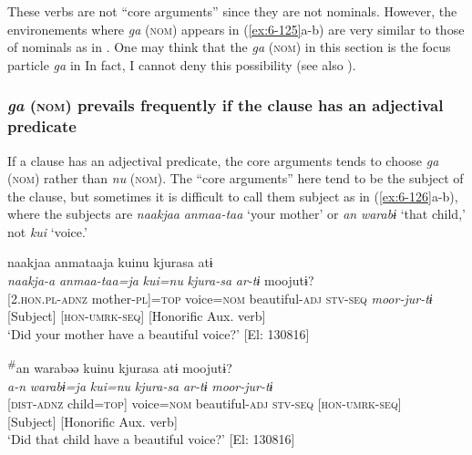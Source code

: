 These verbs are not “core arguments” since they are not nominals. However, the environements where \textit{ga} (\textsc{nom}) appears in (\ref{ex:6-125}a-b) are very similar to those of nominals as in . One may think that the \textit{ga} (\textsc{nom}) in this section is the focus particle \textit{ga} in  In fact, I cannot deny this possibility (see also ).

\subsubsection{\textit{ga} (\textsc{nom}) prevails frequently if the clause has an adjectival predicate}

If a clause has an adjectival predicate, the core arguments tends to choose \textit{ga} (\textsc{nom}) rather than \textit{nu} (\textsc{nom}). The “core arguments” here tend to be the subject of the clause, but sometimes it is difficult to call them subject as in (\ref{ex:6-126}a-b), where the subjects are \textit{naakjaa} \textit{anmaa-taa} ‘your mother’ or \textit{an} \textit{warabɨ} ‘that child,’ not \textit{kui} ‘voice.’

\ea\label{ex:6-126}
\ea
{\TM}
\gllll naakjaa  anmataaja  kuinu  kjurasa  atɨ\\
\textit{naakja-a}  \textit{anmaa-taa=ja}  \textit{kui=nu}  \textit{kjura-sa}  \textit{ar-tɨ}    moojutɨ?\\
      {}[2.\textsc{hon}.\textsc{pl}-\textsc{adnz}  mother-\textsc{pl}]=\textsc{top}  voice=\textsc{nom}  beautiful-\textsc{adj}  \textsc{stv}-\textsc{seq}    \textit{moor-jur-tɨ}\\
      {}[Subject]            [\textsc{hon}-\textsc{umrk}-\textsc{seq}]      [Honorific Aux. verb]\\
\glt ‘Did your mother have a beautiful voice?’ [El: 130816]

\ex
{\TM}
\gll \textsuperscript{\#}an  warabəə  kuinu  kjurasa  atɨ   moojutɨ?\\
       \textit{a-n}  \textit{warabɨ=ja}  \textit{kui=nu}  \textit{kjura-sa}  \textit{ar-tɨ}    \textit{moor-jur-tɨ}\\
       {}[\textsc{dist}-\textsc{adnz}  child=\textsc{top}]  voice=\textsc{nom}  beautiful-\textsc{adj}  \textsc{stv}-\textsc{seq}     [\textsc{hon}-\textsc{umrk}-\textsc{seq}]\\
       {}[Subject]            [Honorific Aux. verb]\\
 ‘Did that child have a beautiful voice?’ [El: 130816]
\z
\z


